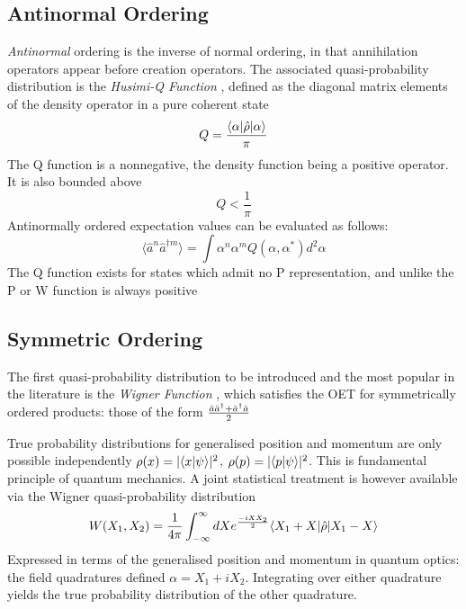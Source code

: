 \subsection{Antinormal Ordering}

\emph{Antinormal} ordering is the inverse of normal ordering, in that annihilation operators appear before creation operators. The associated quasi-probability distribution is the \emph{Husimi-Q Function} \autocite{Husimi1940}, defined as the diagonal matrix elements of the density operator in a pure coherent state
\begin{equation}
	Q = \frac{\langle \alpha | \hat{\rho} | \alpha \rangle}{\pi}
	\label{qdef}
\end{equation}
The Q function is a nonnegative, the density function being a positive operator. It is also bounded above 
\begin{equation}
	Q < \frac{1}{\pi}
\end{equation}
Antinormally ordered expectation values can be evaluated as follows:
\begin{equation}
	\langle \hat{a}^n \hat{a}^{\dagger m}  \rangle = \int \alpha^n \alpha^m Q (\alpha, \alpha^*) d^2 \alpha
\end{equation}
The Q function exists for states which admit no P representation, and unlike the P or W function is always positive

\subsection{Symmetric Ordering}

The first quasi-probability distribution to be introduced and the most popular in the literature is the \emph{Wigner Function} \autocite{Wigner1932}, which satisfies the OET for symmetrically ordered products: those of the form $\frac{\hat{a} \hat{a}^\dagger + \hat{a}^\dagger \hat{a}}{2}$

True probability distributions for generalised position and momentum are only possible independently $\rho(x) = |\langle x | \psi \rangle|^2$, $\rho(p) = |\langle p | \psi \rangle|^2$. This is fundamental principle of quantum mechanics. A joint statistical treatment is however available via the Wigner quasi-probability distribution
\begin{equation}
	W(X_1, X_2) = \frac{1}{4 \pi} \int_{-\infty}^\infty dX e^{\frac{-iXX_2}{2}} \langle X_1+X | \hat{\rho} | X_1-X \rangle
\end{equation}
Expressed in terms of the generalised position and momentum in quantum optics: the field quadratures defined $\alpha = X_1 + iX_2$. Integrating over either quadrature yields the true probability distribution of the other quadrature.

